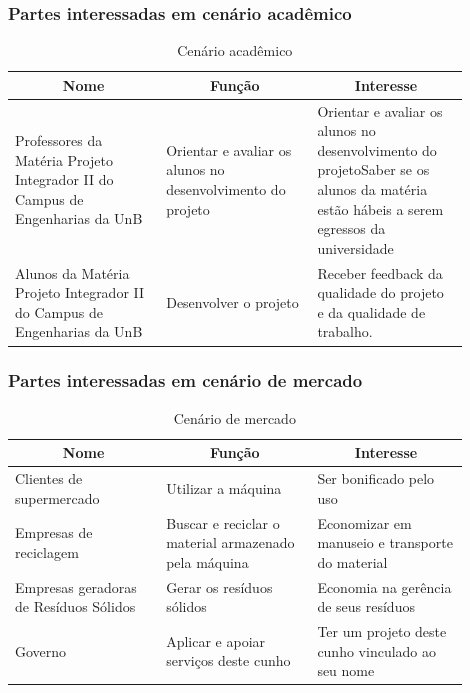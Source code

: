\begin{apendicesenv}
\subsubsection{Partes interessadas em cenário acadêmico}

\begin{table}[htp]
    \centering
    \caption{Cenário acadêmico}
    \label{my-label}
    \begin{tabular}{|p{0.30\linewidth}|p{0.30\linewidth}|p{0.30\linewidth}|}
    \hline
    \multicolumn{1}{|c|}{\textbf{Nome}} & \multicolumn{1}{c|}{\textbf{Função}} & \multicolumn{1}{c|}{\textbf{Interesse}} \\ \hline
    Professores da Matéria Projeto Integrador II do Campus de Engenharias da UnB & Orientar e avaliar os alunos no desenvolvimento do projeto & Orientar e avaliar os alunos no desenvolvimento do projetoSaber se os alunos da matéria estão hábeis a serem egressos da universidade \\ \hline
    Alunos da Matéria Projeto Integrador II do Campus de Engenharias da UnB & Desenvolver o projeto & Receber feedback da qualidade do projeto e da qualidade de trabalho. \\ \hline
    \end{tabular}
\end{table}

\subsubsection{Partes interessadas em cenário de mercado}

\begin{table}[htp]
    \centering
    \caption{Cenário de mercado}
    \label{my-label}
    \begin{tabular}{|p{0.30\linewidth}|p{0.30\linewidth}|p{0.30\linewidth}|}
    \hline
    \multicolumn{1}{|c|}{\textbf{Nome}} & \multicolumn{1}{c|}{\textbf{Função}} & \multicolumn{1}{c|}{\textbf{Interesse}} \\ \hline
    Clientes de supermercado & Utilizar a máquina & Ser bonificado pelo uso \\ \hline
    Empresas de reciclagem & Buscar e reciclar o material armazenado pela máquina & Economizar em manuseio e transporte do material \\ \hline
    Empresas geradoras de Resíduos Sólidos & Gerar os resíduos sólidos & Economia na gerência de seus resíduos \\ \hline
    Governo & Aplicar e apoiar serviços deste cunho & Ter um projeto deste cunho vinculado ao seu nome \\ \hline
    \end{tabular}
\end{table}


\end{apendicesenv}
